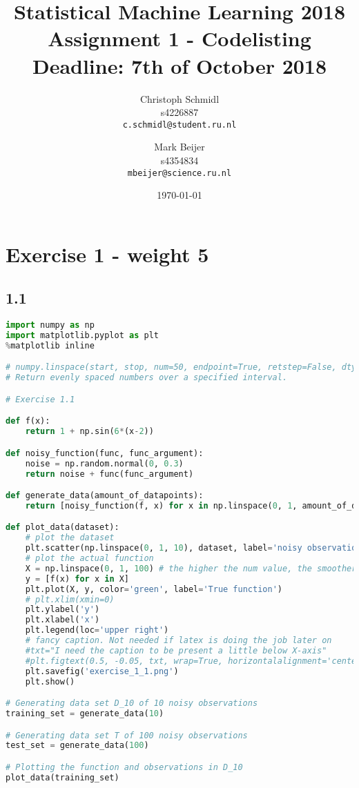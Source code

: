 \documentclass[a4paper]{article}
\title{Statistical Machine Learning 2018\\Assignment 1 - Codelisting\\Deadline: 7th of October 2018}
\author{
  Christoph Schmidl\\ s4226887\\      \texttt{c.schmidl@student.ru.nl}
  \and
  Mark Beijer\\ s4354834\\     \texttt{mbeijer@science.ru.nl}
}
\date{\today}
\begin{document}
\maketitle


\section*{Exercise 1 - weight 5}


\subsection*{1.1}


\begin{lstlisting}[language=Python]
import numpy as np
import matplotlib.pyplot as plt
%matplotlib inline

# numpy.linspace(start, stop, num=50, endpoint=True, retstep=False, dtype=None)
# Return evenly spaced numbers over a specified interval.

# Exercise 1.1

def f(x):
	return 1 + np.sin(6*(x-2))

def noisy_function(func, func_argument):
	noise = np.random.normal(0, 0.3)
	return noise + func(func_argument)

def generate_data(amount_of_datapoints):
    return [noisy_function(f, x) for x in np.linspace(0, 1, amount_of_datapoints)]

def plot_data(dataset):
    # plot the dataset
    plt.scatter(np.linspace(0, 1, 10), dataset, label='noisy observations')
    # plot the actual function
    X = np.linspace(0, 1, 100) # the higher the num value, the smoother the function plot gets
    y = [f(x) for x in X]
    plt.plot(X, y, color='green', label='True function')
    # plt.xlim(xmin=0)
    plt.ylabel('y')
    plt.xlabel('x')
    plt.legend(loc='upper right')
    # fancy caption. Not needed if latex is doing the job later on
    #txt="I need the caption to be present a little below X-axis"
    #plt.figtext(0.5, -0.05, txt, wrap=True, horizontalalignment='center', fontsize=12)
    plt.savefig('exercise_1_1.png')
    plt.show()

# Generating data set D_10 of 10 noisy observations
training_set = generate_data(10)

# Generating data set T of 100 noisy observations
test_set = generate_data(100)

# Plotting the function and observations in D_10
plot_data(training_set)
\end{lstlisting}
\end{document}
